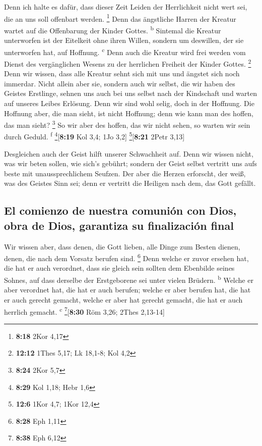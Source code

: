  Denn ich halte es dafür, dass dieser Zeit Leiden der
Herrlichkeit nicht wert sei, die an uns soll offenbart werden.
\footnote{\textbf{8:18} 2Kor 4,17}  Denn das ängstliche
Harren der Kreatur wartet auf die Offenbarung der Kinder Gottes.
\textsuperscript{b}  Sintemal die Kreatur unterworfen ist
der Eitelkeit ohne ihren Willen, sondern um deswillen, der sie
unterworfen hat, auf Hoffnung. \textsuperscript{c}  Denn
auch die Kreatur wird frei werden vom Dienst des vergänglichen Wesens zu
der herrlichen Freiheit der Kinder Gottes. \footnote{\textbf{12:12}
  1Thes 5,17; Lk 18,1-8; Kol 4,2}  Denn wir wissen, dass
alle Kreatur sehnt sich mit uns und ängstet sich noch immerdar.
 Nicht allein aber sie, sondern auch wir selbst, die wir
haben des Geistes Erstlinge, sehnen uns auch bei uns selbst nach der
Kindschaft und warten auf unseres Leibes Erlösung.  Denn
wir sind wohl selig, doch in der Hoffnung. Die Hoffnung aber, die man
sieht, ist nicht Hoffnung; denn wie kann man des hoffen, das man sieht?
\footnote{\textbf{8:24} 2Kor 5,7}  So wir aber des
hoffen, das wir nicht sehen, so warten wir sein durch Geduld.
\textsuperscript{f} \footnote{\textbf{8:29} Kol 1,18; Hebr 1,6}{[}\textbf{8:19}
Kol 3,4; 1Jo 3,2{]} \footnote{\textbf{12:6} 1Kor 4,7; 1Kor 12,4}{[}\textbf{8:21}
2Petr 3,13{]}

 Desgleichen auch der Geist hilft unserer Schwachheit
auf. Denn wir wissen nicht, was wir beten sollen, wie sich's gebührt;
sondern der Geist selbst vertritt uns aufs beste mit unaussprechlichem
Seufzen.  Der aber die Herzen erforscht, der weiß, was
des Geistes Sinn sei; denn er vertritt die Heiligen nach dem, das Gott
gefällt.

\hypertarget{el-comienzo-de-nuestra-comuniuxf3n-con-dios-obra-de-dios-garantiza-su-finalizaciuxf3n-final}{%
\subsection{El comienzo de nuestra comunión con Dios, obra de Dios,
garantiza su finalización
final}\label{el-comienzo-de-nuestra-comuniuxf3n-con-dios-obra-de-dios-garantiza-su-finalizaciuxf3n-final}}

 Wir wissen aber, dass denen, die Gott lieben, alle Dinge
zum Besten dienen, denen, die nach dem Vorsatz berufen sind. \footnote{\textbf{8:28}
  Eph 1,11}  Denn welche er zuvor ersehen hat, die hat er
auch verordnet, dass sie gleich sein sollten dem Ebenbilde seines
Sohnes, auf dass derselbe der Erstgeborene sei unter vielen Brüdern.
\textsuperscript{b}  Welche er aber verordnet hat, die
hat er auch berufen; welche er aber berufen hat, die hat er auch gerecht
gemacht, welche er aber hat gerecht gemacht, die hat er auch herrlich
gemacht. \textsuperscript{c} \footnote{\textbf{8:38} Eph 6,12}{[}\textbf{8:30}
Röm 3,26; 2Thes 2,13-14{]}

